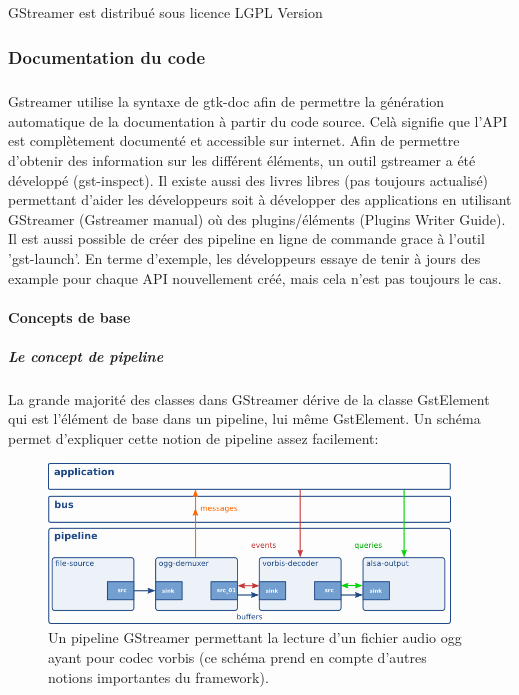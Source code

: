 \subparagraph{}

GStreamer est distribué sous licence LGPL Version

\subsubsection{Documentation du code}

\subparagraph{} Gstreamer utilise la syntaxe de gtk-doc afin de
permettre la génération automatique de la documentation à partir du
code source. Celà signifie que l'API est complètement documenté et
accessible sur internet. Afin de permettre d'obtenir des information
sur les différent éléments, un outil gstreamer a été développé
(gst-inspect). Il existe aussi des livres libres (pas toujours actualisé)
permettant d'aider les développeurs soit à développer des applications
en utilisant GStreamer (Gstreamer manual) où des plugins/éléments
(Plugins Writer Guide).  Il est aussi possible de créer des pipeline en
ligne de commande grace à l'outil 'gst-launch'.  En terme d'exemple,
les développeurs essaye de tenir à jours des example pour chaque API
nouvellement créé, mais cela n'est pas toujours le cas.

\paragraph{Concepts de base}

\subparagraph{Le concept de pipeline}

\subparagraph{}

La grande majorité des classes dans GStreamer dérive de la classe
GstElement qui est l'élément de base dans un pipeline, lui même
GstElement. Un schéma permet d'expliquer cette notion de pipeline
assez facilement:

\newpage \begin{figure} [H]

  \begin{center}

    \includegraphics[width=0.95\textwidth]{images/gstpipeline}

  \end{center}

  \caption{Un pipeline GStreamer permettant la lecture d'un fichier
  audio ogg
    ayant pour codec vorbis (ce schéma prend en compte d'autres notions
    importantes du framework).}

  \label{Yes}

\end{figure}

